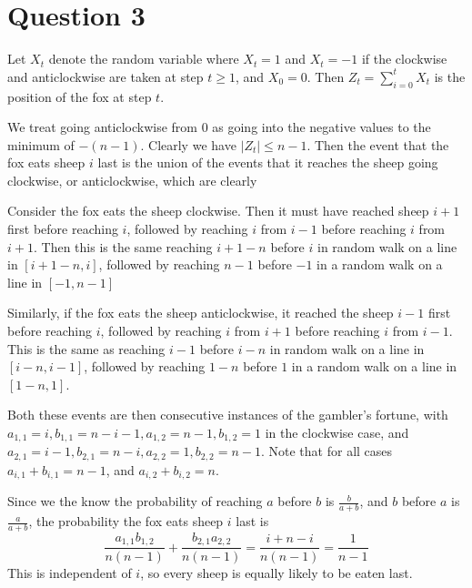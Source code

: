 \documentclass[11pt]{article} %
\begin{document}
\section*{Question 3}
Let $X_t$ denote the random variable where $X_t=1$ and $X_t=-1$ 
if the clockwise and anticlockwise are taken at step $t\geq 1$, and $X_0=0$.
Then $Z_t=\sum_{i=0}^t X_t$ is the position of the fox at step $t$.

We treat going anticlockwise from 0 as going into the negative values to the minimum of $-(n-1)$.
Clearly we have $|Z_t|\leq n-1$.
Then the event that the fox eats sheep $i$ last is the union of the events 
that it reaches the sheep going clockwise, or anticlockwise, which are clearly

Consider the fox eats the sheep clockwise.
Then it must have reached sheep $i+1$ first before reaching $i$,
followed by reaching $i$ from $i-1$ before reaching $i$ from $i+1$.
Then this is the same reaching $i+1-n$ before $i$ in random walk on a line in $[i+1-n,i]$, 
followed by reaching $n-1$ before $-1$ in a random walk on a line in $[-1,n-1]$

Similarly, if the fox eats the sheep anticlockwise,
it reached the sheep $i-1$ first before reaching $i$,
followed by reaching $i$ from $i+1$ before reaching $i$ from $i-1$.
This is the same as reaching $i-1$ before $i-n$ in random walk on a line in $[i-n, i-1]$,
followed by reaching $1-n$ before $1$ in a random walk on a line in $[1-n,1]$.

Both these events are then consecutive instances of the gambler's fortune,
with $a_{1,1}=i,b_{1,1}=n-i-1,a_{1,2}=n-1,b_{1,2}=1$ in the clockwise case,
and $a_{2,1}=i-1,b_{2,1}=n-i,a_{2,2}=1,b_{2,2}=n-1$. 
Note that for all cases $a_{i,1}+b_{i,1}=n-1$, and $a_{i,2}+b_{i,2}=n$.

Since we the know the probability of reaching $a$ before $b$ is $\frac{b}{a+b}$,
and $b$ before $a$ is $\frac{a}{a+b}$,
the probability the fox eats sheep $i$ last is
\[\frac{a_{1,1} b_{1,2}}{n(n-1)} + \frac{b_{2,1} a_{2,2}}{n(n-1)}
=\frac{i+n-i}{n(n-1)}
=\frac{1}{n-1}
\]
This is independent of $i$, so every sheep is equally likely to be eaten last.

\clearpage
\end{document}

